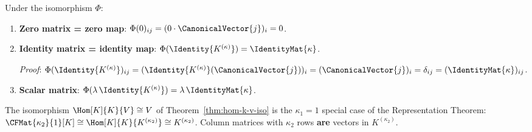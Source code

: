 \begin{corollary}
\label{cor:special-matrices}
    Under the isomorphism $\Phi$:
    \begin{enumerate}
        \item \textbf{Zero matrix = zero map}:
              $\Phi(0)_{ij} = (0 \cdot \CanonicalVector{j})_i = 0$.
        \item \textbf{Identity matrix = identity map}:
              $\Phi(\Identity{K^{(\kappa)}}) = \IdentityMat{\kappa}$.

              \textit{Proof}: $\Phi(\Identity{K^{(\kappa)}})_{ij}
              = (\Identity{K^{(\kappa)}}(\CanonicalVector{j}))_i = (\CanonicalVector{j})_i = \delta_{ij}
              = (\IdentityMat{\kappa})_{ij}$.
        \item \textbf{Scalar matrix}:
              $\Phi(\lambda\, \Identity{K^{(\kappa)}})
              = \lambda\, \IdentityMat{\kappa}$.
    \end{enumerate}
\end{corollary}

\begin{remark}
\label{rem:vec-as-hom}
    The isomorphism $\Hom[K]{K}{V} \cong V$ of Theorem~\ref{thm:hom-k-v-iso} is the
    $\kappa_1 = 1$ special case of the Representation Theorem:
    $\CFMat{\kappa_2}{1}[K] \cong \Hom[K]{K}{K^{(\kappa_2)}} \cong K^{(\kappa_2)}$.
    Column matrices with $\kappa_2$ rows \textbf{are} vectors in $K^{(\kappa_2)}$.
\end{remark}

